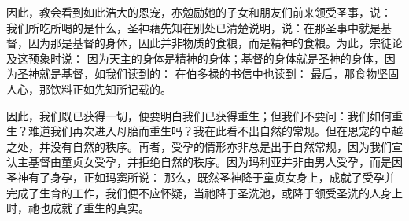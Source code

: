 因此，教会看到如此浩大的恩宠，亦勉励她的子女和朋友们前来领受圣事，说： 我们所吃所喝的是什么，圣神藉先知在别处已清楚说明，说：在那圣事中就是基督，因为那是基督的身体，因此并非物质的食粮，而是精神的食粮。为此，宗徒论及这预象时说： 因为天主的身体是精神的身体；基督的身体就是圣神的身体，因为圣神就是基督，如我们读到的： 在伯多禄的书信中也读到： 最后，那食物坚固人心，那饮料正如先知所记载的。\par

因此，我们既已获得一切，便要明白我们已获得重生；但我们不要问：我们如何重生？难道我们再次进入母胎而重生吗？我在此看不出自然的常规。但在恩宠的卓越之处，并没有自然的秩序。再者，受孕的情形亦非总是出于自然常规，因为我们宣认主基督由童贞女受孕，并拒绝自然的秩序。因为玛利亚并非由男人受孕，而是因圣神有了身孕，正如玛窦所说： 那么，既然圣神降于童贞女身上，成就了受孕并完成了生育的工作，我们便不应怀疑，当祂降于圣洗池，或降于领受圣洗的人身上时，祂也成就了重生的真实。\par

